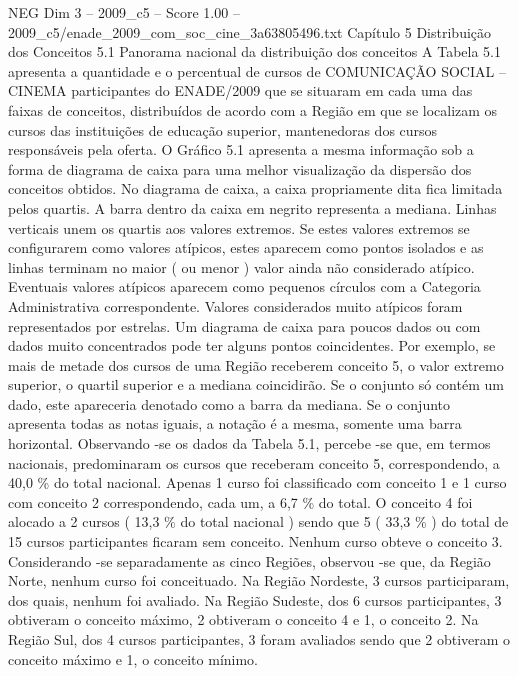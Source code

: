 \begin{textsample}{NEG Dim 3 – 2009\_c5 – Score 1.00 – 2009\_c5/enade\_2009\_com\_soc\_cine\_3a63805496.txt}  \label{ex:f3_neg_105}
Capítulo 5 Distribuição dos Conceitos 5.1 Panorama nacional da distribuição dos conceitos A Tabela 5.1 apresenta a quantidade e o percentual de cursos de COMUNICAÇÃO SOCIAL – CINEMA participantes do ENADE/2009 que se situaram em cada uma das faixas de conceitos, distribuídos de acordo com a Região em que se localizam os cursos das instituições de educação superior, mantenedoras dos cursos responsáveis pela oferta.
O Gráfico 5.1 apresenta a mesma informação sob a forma de diagrama de caixa para uma melhor visualização da dispersão dos conceitos obtidos.
No diagrama de caixa, a caixa propriamente dita fica limitada pelos quartis.
A barra dentro da caixa em negrito representa a mediana.
Linhas verticais unem os quartis aos valores extremos.
Se estes valores extremos se configurarem como valores atípicos, estes aparecem como pontos isolados e as linhas terminam no maior ( ou menor ) valor ainda não considerado atípico.
Eventuais valores atípicos aparecem como pequenos círculos com a Categoria Administrativa correspondente.
Valores considerados muito atípicos foram representados por estrelas.
Um diagrama de caixa para poucos dados ou com dados muito concentrados pode ter alguns pontos coincidentes.
Por exemplo, se mais de metade dos cursos de uma Região receberem conceito 5, o valor extremo superior, o quartil superior e a mediana coincidirão.
Se o conjunto só contém um dado, este apareceria denotado como a barra da mediana.
Se o conjunto apresenta todas as notas iguais, a notação é a mesma, somente uma barra horizontal.
Observando -se os dados da Tabela 5.1, percebe -se que, em termos nacionais, predominaram os cursos que receberam conceito 5, correspondendo, a 40,0 \% do total nacional.
Apenas 1 curso foi classificado com conceito 1 e 1 curso com conceito 2 correspondendo, cada um, a 6,7 \% do total.
O conceito 4 foi alocado a 2 cursos ( 13,3 \% do total nacional ) sendo que 5 ( 33,3 \% ) do total de 15 cursos participantes ficaram sem conceito.
Nenhum curso obteve o conceito 3.
Considerando -se separadamente as cinco Regiões, observou -se que, da Região Norte, nenhum curso foi conceituado.
Na Região Nordeste, 3 cursos participaram, dos quais, nenhum foi avaliado.
Na Região Sudeste, dos 6 cursos participantes, 3 obtiveram o conceito máximo, 2 obtiveram o conceito 4 e 1, o conceito 2.
Na Região Sul, dos 4 cursos participantes, 3 foram avaliados sendo que 2 obtiveram o conceito máximo e 1, o conceito mínimo.

\end{textsample}
